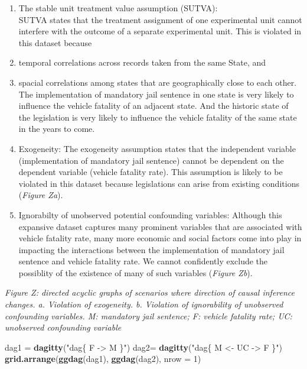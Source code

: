 \documentclass[]{article}
\newenvironment{Shaded}{\begin{snugshade}}{\end{snugshade}}
\newcommand{\DataTypeTok}[1]{\textcolor[rgb]{0.13,0.29,0.53}{#1}}
\newcommand{\DecValTok}[1]{\textcolor[rgb]{0.00,0.00,0.81}{#1}}
\newcommand{\KeywordTok}[1]{\textcolor[rgb]{0.13,0.29,0.53}{\textbf{#1}}}
\newcommand{\NormalTok}[1]{#1}
\newcommand{\StringTok}[1]{\textcolor[rgb]{0.31,0.60,0.02}{#1}}
\begin{document}
\begin{enumerate}
\def\labelenumi{\arabic{enumi}.}
\item
  The stable unit treatment value assumption (SUTVA):\\
  SUTVA states that the treatment assignment of one experimental unit cannot interfere with the outcome of a separate experimental unit. This is violated in this dataset because\\
\item
  temporal correlations across records taken from the same State, and
\item
  spacial correlations among states that are geographically close to each other.\\
  The implementation of mandatory jail sentence in one state is very likely to influence the vehicle fatality of an adjacent state. And the historic state of the legislation is very likely to influence the vehicle fatality of the same state in the years to come.
\item
  Exogeneity:
  The exogeneity assumption states that the independent variable (implementation of mandatory jail sentence) cannot be dependent on the dependent variable (vehicle fatality rate). This assumption is likely to be violated in this dataset because legislations can arise from existing conditions (\emph{Figure Za}).
\item
  Ignorabilty of unobserved potential confounding variables:
  Although this expansive dataset captures many prominent variables that are associated with vehicle fatality rate, many more economic and social factors come into play in impacting the interactions between the implementation of mandatory jail sentence and vehicle fatality rate. We cannot confidently exclude the possiblity of the existence of many of such variables (\emph{Figure Zb}).
\end{enumerate}

\emph{Figure Z: directed acyclic graphs of scenarios where direction of causal inference changes. a. Violation of exogeneity. b. Violation of ignorability of unobserved confounding variables. M: mandatory jail sentence; F: vehicle fatality rate; UC: unobserved confounding variable}

\begin{Shaded}
\begin{Highlighting}[]
\NormalTok{dag1 =}\StringTok{ }\KeywordTok{dagitty}\NormalTok{(}\StringTok{"dag\{ F -> M \}"}\NormalTok{)}
\NormalTok{dag2=}\StringTok{ }\KeywordTok{dagitty}\NormalTok{(}\StringTok{"dag\{ M <- UC -> F \}"}\NormalTok{)}
\KeywordTok{grid.arrange}\NormalTok{(}\KeywordTok{ggdag}\NormalTok{(dag1), }\KeywordTok{ggdag}\NormalTok{(dag2), }\DataTypeTok{nrow =} \DecValTok{1}\NormalTok{)}
\end{Highlighting}
\end{Shaded}
\end{document}
